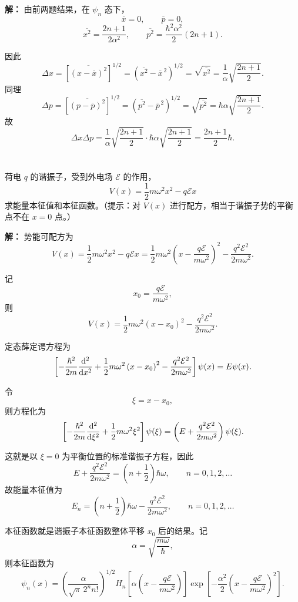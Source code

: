\documentclass[12pt,a4paper]{article}
\begin{document}
\vspace{0.5cm}

\noindent\textbf{解：}
由前两题结果，在 \(\psi_n\) 态下，
\[
\overline{x}=0,
\qquad
\overline{p}=0,
\]
\[
\overline{x^2}=\frac{2n+1}{2\alpha^2},
\qquad
\overline{p^2}=\frac{\hbar^2\alpha^2}{2}\left(2n+1\right).
\]

因此
\[
\Delta x=\left[\overline{\left(x-\overline{x}\right)^2}\right]^{1/2}
=\left(\overline{x^2}-\overline{x}^{\,2}\right)^{1/2}
=\sqrt{\overline{x^2}}
=\frac{1}{\alpha}\sqrt{\frac{2n+1}{2}}.
\]
同理
\[
\Delta p=\left[\overline{\left(p-\overline{p}\right)^2}\right]^{1/2}
=\left(\overline{p^2}-\overline{p}^{\,2}\right)^{1/2}
=\sqrt{\overline{p^2}}
=\hbar\alpha\sqrt{\frac{2n+1}{2}}.
\]
故
\[
\Delta x\Delta p
=
\frac{1}{\alpha}\sqrt{\frac{2n+1}{2}}
\cdot
\hbar\alpha\sqrt{\frac{2n+1}{2}}
=
\frac{2n+1}{2}\hbar.
\]

\section{}
荷电 $q$ 的谐振子，受到外电场 $\mathcal{E}$ 的作用，
\[
V(x)=\frac{1}{2}m\omega^2x^2-q\mathcal{E}x
\]
求能量本征值和本征函数。（提示：对 $V(x)$ 进行配方，相当于谐振子势的平衡点不在 $x=0$ 点。）

\vspace{0.5cm}

\noindent\textbf{解：}
势能可配方为
\[
V(x)
=
\frac{1}{2}m\omega^2x^2-q\mathcal{E}x
=
\frac{1}{2}m\omega^2\left(x-\frac{q\mathcal{E}}{m\omega^2}\right)^2
-\frac{q^2\mathcal{E}^2}{2m\omega^2}.
\]

记
\[
x_0=\frac{q\mathcal{E}}{m\omega^2},
\]
则
\[
V(x)=\frac{1}{2}m\omega^2\left(x-x_0\right)^2-\frac{q^2\mathcal{E}^2}{2m\omega^2}.
\]

定态薛定谔方程为
\[
\left[
-\frac{\hbar^2}{2m}\dv[2]{}{x}
+\frac{1}{2}m\omega^2\left(x-x_0\right)^2
-\frac{q^2\mathcal{E}^2}{2m\omega^2}
\right]\psi(x)
=
E\psi(x).
\]

令
\[
\xi=x-x_0,
\]
则方程化为
\[
\left[
-\frac{\hbar^2}{2m}\dv[2]{}{\xi}
+\frac{1}{2}m\omega^2\xi^2
\right]\psi(\xi)
=
\left(
E+\frac{q^2\mathcal{E}^2}{2m\omega^2}
\right)\psi(\xi).
\]

这就是以 \(\xi=0\) 为平衡位置的标准谐振子方程，因此
\[
E+\frac{q^2\mathcal{E}^2}{2m\omega^2}
=
\left(n+\frac{1}{2}\right)\hbar\omega,
\qquad
n=0,1,2,\dots
\]
故能量本征值为
\[
E_n
=
\left(n+\frac{1}{2}\right)\hbar\omega
-\frac{q^2\mathcal{E}^2}{2m\omega^2},
\qquad
n=0,1,2,\dots
\]

本征函数就是谐振子本征函数整体平移 \(x_0\) 后的结果。记
\[
\alpha=\sqrt{\frac{m\omega}{\hbar}},
\]
则本征函数为
\[
\psi_n(x)
=
\left(\frac{\alpha}{\sqrt{\pi}\,2^n n!}\right)^{1/2}
H_n\left[\alpha\left(x-\frac{q\mathcal{E}}{m\omega^2}\right)\right]
\exp\left[
-\frac{\alpha^2}{2}
\left(x-\frac{q\mathcal{E}}{m\omega^2}\right)^2
\right].
\]
\end{document}
